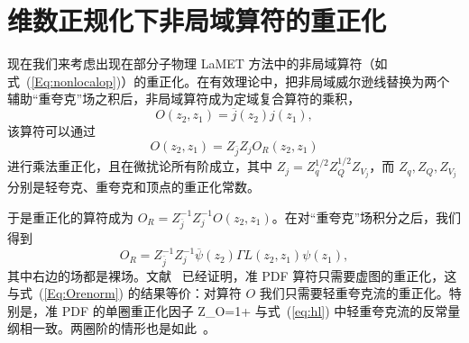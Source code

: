 \section{维数正规化下非局域算符的重正化}

现在我们来考虑出现在部分子物理 LaMET 方法中的非局域算符（如式~(\ref{Eq:nonlocalop})）的重正化。在有效理论中，把非局域威尔逊线替换为两个辅助“重夸克”场之积后，非局域算符成为定域复合算符的乘积，
\begin{equation}
 O(z_2, z_1) = \overline{j}(z_2) j(z_1),
\end{equation}
该算符可以通过
 \begin{equation}
        O(z_2,z_1)= Z_{\bar j}Z_{j} O_R(z_2,z_1)
\end{equation}
进行乘法重正化，且在微扰论所有阶成立，其中 $Z_{j}=Z_q^{1/2} Z_Q^{1/2} Z_{V_j}$，而 $Z_q, Z_Q, Z_{V_j}$ 分别是轻夸克、重夸克和顶点的重正化常数。

于是重正化的算符成为 $O_R=Z_{\bar j}^{-1}Z_{j}^{-1}O(z_2,z_1)$。在对“重夸克”场积分之后，我们得到
\begin{equation}\label{Eq:Orenorm}
        O_R = Z_{\bar j}^{-1}Z_{j}^{-1} \overline{\psi}(z_2) \Gamma L(z_2,z_1)\psi(z_1),
\end{equation}
其中右边的场都是裸场。文献~\cite{Ji:2015jwa} 已经证明，准 PDF 算符只需要虚图的重正化，这与式~(\ref{Eq:Orenorm}) 的结果等价：对算符 $O$ 我们只需要轻重夸克流的重正化。特别是，准 PDF 的单圈重正化因子
\beq\label{Eq:1loopZfac}
Z_O=1+
\eeq
与式~(\ref{eq:hl}) 中轻重夸克流的反常量纲相一致。两圈阶的情形也是如此~\cite{Ji:2015jwa}。
